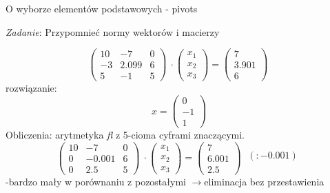 \begin{frame}{ O wyborze elementów podstawowych - pivots}
\begin{flushright}
{\it Zadanie}: Przypomnieć normy wektorów $\mathrm{i}$ macierzy
\end{flushright}
$$
\left(\begin{array}{lll}
10 & -7 & 0\\
-3 & 2.099 & 6\\
5 & -1 & 5
\end{array}\right)\ \cdot
\left(\begin{array}{l}
x_{1}\\
x_{2}\\
x_{3}
\end{array}\right)=\left(\begin{array}{l}
7\\
3.901\\
6
\end{array}\right)\ 
$$
rozwiązanie:
$$
x=\left(\begin{array}{l}
0\\
-1\\
1
\end{array}\right)
$$
Obliczenia: arytmetyka {\it fl} z 5-cioma cyframi znaczącymi.
$$
\left(\begin{array}{lll}
10 & -7 & 0\\
0 & -0.001 & 6\\
0 & 2.5 & 5
\end{array}\right)\ \cdot
\left(\begin{array}{l}
x_{1}\\
x_{2}\\
x_{3}
\end{array}\right)=\left(\begin{array}{l}
7\\
6.001\\
2.5
\end{array}\right)\ 
\begin{array}{l}
\\
(:-0.001)
\\
\\
\end{array}
$$
 -bardzo mały w porównaniu z pozostałymi $\rightarrow$eliminacja bez przestawienia

\end{frame}

